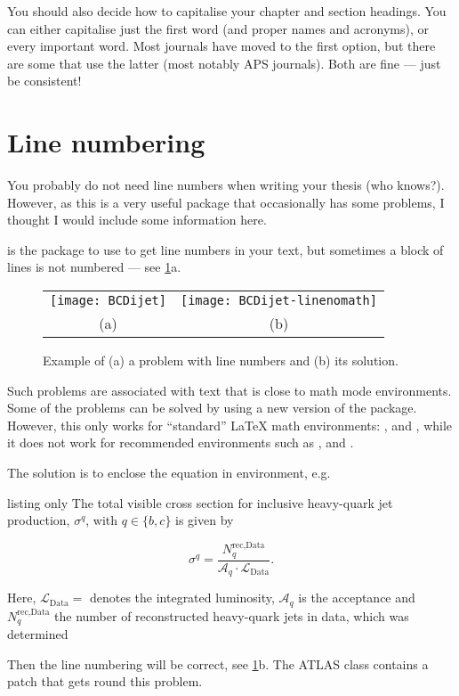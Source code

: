 You should also decide how to capitalise your chapter and section headings.
You can either capitalise just the first word (and proper names and acronyms),
or every important word.
Most journals have moved to the first option,
but there are some that use the latter (most notably APS journals).
Both are fine --- just be consistent!

\section{Line numbering}%
\label{sec:tips:lineno}

You probably do not need line numbers when writing your
thesis (who knows?). However, as this is a very useful package that
occasionally has some problems, I thought I would include some
information here.

 is the package to use to get line numbers in your text,
but sometimes a block of lines is not numbered --- see \cref{fig:lineno}a.

\begin{figure}[htbp]
  \centering
  \begin{tabular}{cc}
  \texttt{[image: BCDijet]} &
  \texttt{[image: BCDijet-linenomath]}\\
  (a) & (b)
  \end{tabular}
  \caption{Example of (a) a problem with line numbers and (b) its solution.}%
  \label{fig:lineno}
\end{figure}

Such problems are associated with text that is close to math mode environments.
Some of the problems can be solved by using a new
version of the  package.
However, this only works for \enquote{standard} \LaTeX{}
math environments: ,  and , while it does
not work for recommended  environments such as ,
 and . %

The solution is to enclose the equation in  environment, e.g.
\begin{tcblisting}{listing only}
The total visible cross section for inclusive heavy-quark jet
production, \(\sigma^{q}\), with \(q\in\{b,c\}\) is given by
\begin{linenomath}
\begin{equation*}
  \sigma^{q} = \frac{N_{q}^{\text{rec,Data}}}%
    {\mathcal{A}_{q}\cdot\mathcal{L}_{\text{Data}}}.
\end{equation*}
\end{linenomath}
Here, \(\mathcal{L}_{\text{Data}}=\) denotes the integrated luminosity,
\(\mathcal{A}_{q}\) is the acceptance and \(N_{q}^{\text{rec,Data}}\) the
number of reconstructed heavy-quark jets in data, which was determined
\end{tcblisting}
\noindent
Then the line numbering will be correct, see \cref{fig:lineno}b.
The ATLAS  class contains a patch that gets round this problem.



